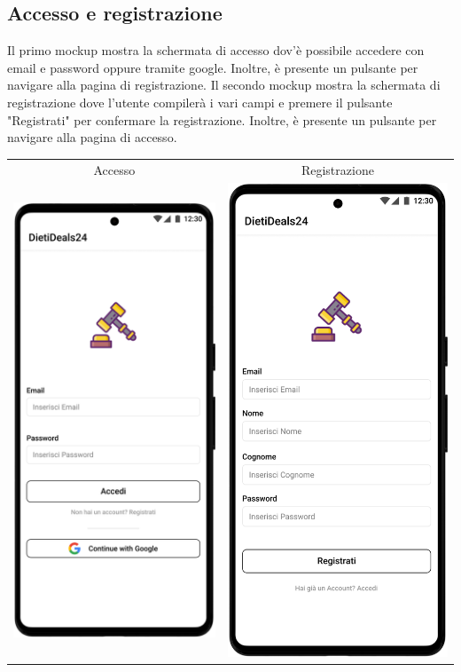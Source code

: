 \subsection{Accesso e registrazione}
Il primo mockup mostra la schermata di accesso dov'è possibile accedere con email e password oppure tramite google.
Inoltre, è presente un pulsante per navigare alla pagina di registrazione.\sskip
Il secondo mockup mostra la schermata di registrazione dove l'utente compilerà i vari campi e premere il pulsante "Registrati" per confermare la registrazione.
Inoltre, è presente un pulsante per navigare alla pagina di accesso.
\begin{center}
	\begin{tabular}{cc}
		Accesso                                                          &
		Registrazione                                                          \\
		\includegraphics[width=.35\textwidth]{images/mockup/Accesso.png} &
		\includegraphics[width=.35\textwidth]{images/mockup/Registrazione.png} \\
	\end{tabular}
\end{center}

